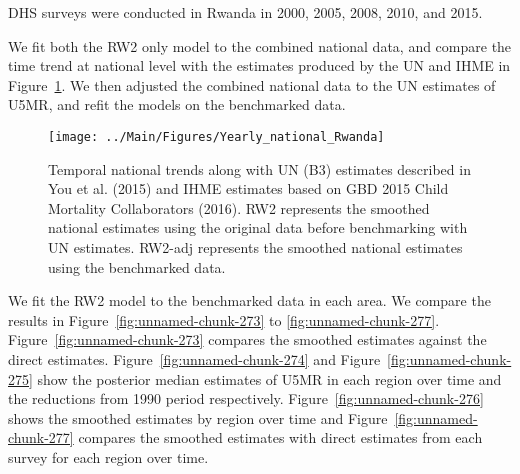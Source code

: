 \documentclass[12pt]{article}\usepackage[]{graphicx}\usepackage[]{color}
\newenvironment{knitrout}{}{} %
\begin{document}


DHS surveys were conducted in Rwanda in 2000, 2005, 2008, 2010, and 2015.

We fit both the RW2 only model to the combined national data, and compare the time trend at national level with the estimates produced by the UN and IHME in Figure~\ref{fig:unnamed-chunk-272}. We then adjusted the combined national data to the UN estimates of U5MR, and refit the models on the benchmarked data. 

\begin{knitrout}
\color{fgcolor}\begin{figure}[bht]

{\centering \texttt{[image: ../Main/Figures/Yearly\_national\_Rwanda]} 

}

\caption[Temporal national trends along with UN (B3) estimates described in You et al]{Temporal national trends along with UN (B3) estimates described in You et al. (2015) and IHME estimates based on GBD 2015 Child Mortality Collaborators (2016). RW2 represents the smoothed national estimates using the original data before benchmarking with UN estimates. RW2-adj represents the smoothed national estimates using the benchmarked data.}\label{fig:unnamed-chunk-272}
\end{figure}


\end{knitrout}
 

We fit the RW2 model to the benchmarked data in each area. 
We compare the results in Figure~\ref{fig:unnamed-chunk-273} to \ref{fig:unnamed-chunk-277}.
Figure~\ref{fig:unnamed-chunk-273} compares the smoothed estimates against the direct estimates. Figure~\ref{fig:unnamed-chunk-274} and Figure~\ref{fig:unnamed-chunk-275} show the posterior median estimates of U5MR in each region over time and the reductions from 1990 period respectively.
Figure~\ref{fig:unnamed-chunk-276} shows the smoothed estimates by region over time and Figure~\ref{fig:unnamed-chunk-277} compares the smoothed estimates with direct estimates from each survey for each region over time.


\end{document}
